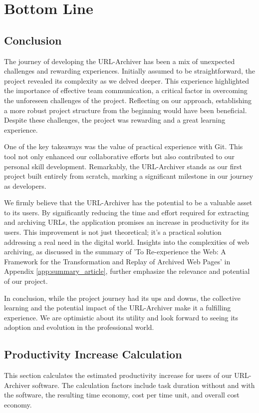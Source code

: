 \section{Bottom Line}

\subsection{Conclusion}
The journey of developing the URL-Archiver has been a mix of unexpected challenges and rewarding experiences.
Initially assumed to be straightforward, the project revealed its complexity as we delved deeper.
This experience highlighted the importance of effective team communication, a critical factor in overcoming the unforeseen challenges of the project.
Reflecting on our approach, establishing a more robust project structure from the beginning would have been beneficial.
Despite these challenges, the project was rewarding and a great learning experience.

One of the key takeaways was the value of practical experience with Git.
This tool not only enhanced our collaborative efforts but also contributed to our personal skill development.
Remarkably, the URL-Archiver stands as our first project built entirely from scratch, marking a significant milestone in our journey as developers.

We firmly believe that the URL-Archiver has the potential to be a valuable asset to its users.
By significantly reducing the time and effort required for extracting and archiving URLs, the application promises an increase in productivity for its users.
This improvement is not just theoretical; it's a practical solution addressing a real need in the digital world. Insights into the complexities of web archiving, as discussed in the summary of 'To Re-experience the Web: A Framework for the
Transformation and Replay of Archived Web Pages' \cite{berlin2023reexperience} in Appendix \ref{app:summary_article}, further emphasize the relevance and potential of our project.

In conclusion, while the project journey had its ups and downs, the collective learning and the potential impact of the URL-Archiver make it a fulfilling experience.
We are optimistic about its utility and look forward to seeing its adoption and evolution in the professional world.
\clearpage
\subsection{Productivity Increase Calculation}
This section calculates the estimated productivity increase for users of our URL-Archiver software.
The calculation factors include task duration without and with the software, the resulting time economy, cost per time unit, and overall cost economy.


